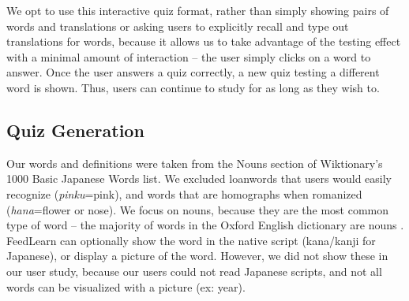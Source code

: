 \documentclass{chi-ext}
\begin{document}

We opt to use this interactive quiz format, rather than simply showing pairs of words and translations or asking users to explicitly recall and type out translations for words, because it allows us to take advantage of the testing effect with a minimal amount of interaction -- the user simply clicks on a word to answer. Once the user answers a quiz correctly, a new quiz testing a different word is shown. Thus, users can continue to study for as long as they wish to.

 \subsection{Quiz Generation}

Our words and definitions were taken from the Nouns section of Wiktionary's 1000 Basic Japanese Words list. We excluded loanwords that users would easily recognize (\textit{pinku}=pink), and words that are homographs when romanized (\textit{hana}=flower or nose). We focus on nouns, because they are the most common type of word -- the majority of words in the Oxford English dictionary are nouns \cite{microlearning}. FeedLearn can optionally show the word in the native script (kana/kanji for Japanese), or display a picture of the word. However, we did not show these in our user study, because our users could not read Japanese scripts, and not all words can be visualized with a picture (ex: year).

\end{document}
